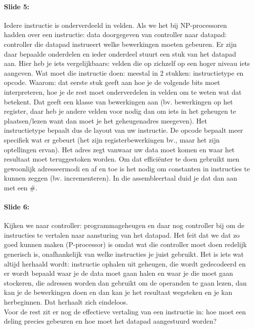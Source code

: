 \documentclass[10pt,a4paper]{book}
\begin{document}
\paragraph{Slide 5:} Iedere instructie is onderverdeeld in velden. Als we het bij NP-processoren hadden over een instructie: data doorgegeven van controller naar datapad: controller die datapad instrueert welke bewerkingen moeten gebeuren. Er zijn daar bepaalde onderdelen en ieder onderdeel stuurt een stuk van het datapad aan. Hier heb je iets vergelijkbaars: velden die op zichzelf op een hoger niveau iets aangeven. Wat moet die instructie doen: meestal in 2 stukken: instructietype en opcode. Waarom: dat eerste stuk geeft aan hoe je de volgende bits moet interpreteren, hoe je de rest moet onderverdelen in velden om te weten wat dat betekent. Dat geeft een klasse van bewerkingen aan (bv. bewerkingen op het register, daar heb je andere velden voor nodig dan om iets in het geheugen te plaatsen/lezen want dan moet je het geheugenadres meegeven). Het instructietype bepaalt dus de layout van uw instructie. De opcode bepaalt meer specifiek wat er gebeurt (het zijn registerbewerkingen bv., maar het zijn optellingen ervan). Het adres zegt vanwaar uw data moet komen en waar het resultaat moet teruggestoken worden. Om dat effici\"enter te doen gebruikt men gewoonlijk adresseermodi en af en toe is het nodig om constanten in instructies te kunnen zeggen (bv. incrementeren). In die assembleertaal duid je dat dan aan met een \#.

\paragraph{Slide 6:} Kijken we naar controller: programmageheugen en daar nog controller bij om de instructies te vertalen naar aansturing van het datapad. Het feit dat we dat zo goed kunnen maken (P-processor) is omdat wat die controller moet doen redelijk generisch is, onafhankelijk van welke instructies je juist gebruikt. Het is iets wat altijd herhaald wordt: instructie ophalen uit geheugen, die wordt gedecodeerd en er wordt bepaald waar je de data moet gaan halen en waar je die moet gaan stockeren, die adressen worden dan gebruikt om de operanden te gaan lezen, dan kan je de bewerkingen doen en dan kan je het resultaat wegsteken en je kan herbeginnen. Dat herhaalt zich eindeloos.\\
Voor de rest zit er nog de effectieve vertaling van een instructie in: hoe moet een deling precies gebeuren en hoe moet het datapad aangestuurd worden?
\end{document}
